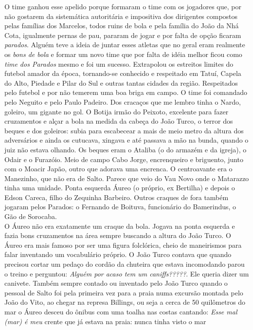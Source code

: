 \documentclass[12pt,brazil,]{book}
\begin{document}
O time ganhou esse apelido porque formaram o time com os jogadores que,
por não gostarem da sistemática autoritária e impositiva dos dirigentes
compostos pelas famílias dos Marcelos, todos ruins de bola e pela
família do João da Nhá Cota, igualmente pernas de pau, pararam de jogar
e por falta de opção ficaram \emph{parados}. Alguém teve a ideia de
juntar esses atletas que no geral eram realmente os \emph{bons de bola}
e formar um novo time que por falta de idéia melhor ficou como
\emph{time dos Parados} mesmo e foi um sucesso. Extrapolou os estreitos
limites do futebol amador da época, tornando-se conhecido e respeitado
em Tatuí, Capela do Alto, Piedade e Pilar do Sul e outras tantas cidades
da região. Respeitados pelo futebol e por não temerem uma boa briga em
campo. O time foi comandado pelo Neguito e pelo Paulo Padeiro. Dos
cracaços que me lembro tinha o Nardo, goleiro, um gigante no gol. O
Botija irmão do Peixoto, excelente para fazer cruzamentos e alçar a bola
na medida da cabeça do João Turco, o terror dos beques e dos goleiros:
subia para escabecear a mais de meio metro da altura dos adversários e
ainda os cutucava, xingava e até passava a mão na bunda, quando o juiz
não estava olhando. Os beques eram o Ataliba (o do armazém e da igreja),
o Odair e o Furazóio. Meio de campo Cabo Jorge, encrenqueiro e
briguento, junto com o Moacir Japão, outro que adorava uma encrenca. O
centroavante era o Manezinho, que não era de Salto. Parece que veio do
Vau Novo onde o Matarazzo tinha uma unidade. Ponta esquerda Áureo (o
próprio, ex Bertilha) e depois o Edson Careca, filho do Zequinha
Barbeiro. Outros craques de fora também jogaram pelos Parados: o
Fernando de Boituva, funcionário do Bamerindus, o Gão de Sorocaba.\\
O Áureo não era exatamente um craque da bola. Jogava na ponta esquerda e
fazia bons cruzamentos na área sempre buscando a altura do João Turco. O
Áureo era mais famoso por ser uma figura folclórica, cheio de
maneirismos para falar inventando um vocabulário próprio. O João Turco
contava que quando precisou cortar um pedaço do cordão da chuteira que
estava incomodando parou o treino e perguntou: \emph{Alguém por acaso
tem um caniffs?????}. Ele queria dizer um canivete. Também sempre
contado ou inventado pelo João Turco quando o pessoal de Salto foi pela
primeira vez para a praia numa excursão montada pelo João do Vito, ao
chegar na represa Billings, ou seja a cerca de 50 quilômetros do mar o
Áureo desceu do ônibus com uma toalha nas costas cantando: \emph{Esse
mal (mar) é meu} crente que já estava na praia: nunca tinha visto o mar
\end{document}
